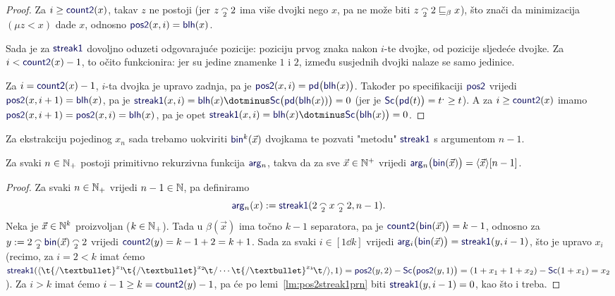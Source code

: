 \begin{proof}
Za $i\ge\f{count2}(x)$, takav $z$ ne postoji (jer $z\conc22$ ima više dvojki nego $x$, pa ne može biti $z\conc22\sqsubseteq_\beta x$), što znači da minimizacija $(\mu z<x)$ dade $x$, odnosno $\f{pos2}(x,i)=\f{blh}(x)$.

Sada je za $\f{streak1}$ dovoljno oduzeti odgovarajuće pozicije: poziciju prvog znaka nakon $i$-te dvojke, od pozicije sljedeće dvojke. Za $i<\f{count2}(x)-1$, to očito funkcionira: jer su jedine znamenke $1$ i $2$, između susjednih dvojki nalaze se samo jedinice.

	Za $i=\f{count2}(x)-1$, $i$-ta dvojka je upravo zadnja, pa je $\f{pos2}(x,i)=\f{pd}\bigl(\f{blh}(x)\bigr)$. Također po specifikaciji $\f{pos2}$ vrijedi $\f{pos2}(x,i+1)=\f{blh}(x)$, pa je $\f{streak1}(x,i)=\f{blh}(x)\dotminus\f{Sc}\bigl(\f{pd}(\f{blh}(x))\bigr)=0$ (jer je $\f{Sc}\bigl(\f{pd}(t)\bigr)=t\bump\ge t$). A za $i\ge\f{count2}(x)$ imamo $\f{pos2}(x,i+1)=\f{pos2}(x,i)=\f{blh}(x)$, pa je opet $\f{streak1}(x,i)=\f{blh}(x)\dotminus\f{Sc}\bigl(\f{blh}(x)\bigr)=0$.
\end{proof}


Za ekstrakciju pojedinog $x_n$ sada trebamo uokviriti $\f{bin}^k(\vec x)$ dvojkama te pozvati "metodu" $\f{streak1}$ s argumentom $n-1$.

\begin{propozicija}[{name=[primitivna rekurzivnost ekstrakcije argumenata]}]\label{pp:argnprn}
    Za svaki $n\in{\mathbb N}_+$ postoji primitivno rekurzivna funkcija $\f{arg}_n$, takva da za sve $\vec x\in{\mathbb N}^+$ vrijedi $\f{arg}_n\bigl(\f{bin}(\vec x)\bigr)=\kr{\vec x}[n-1]$.
\end{propozicija}

\begin{proof}
Za svaki $n\in{\mathbb N}_+$ vrijedi $n-1\in{\mathbb N}$, pa definiramo
\begin{equation}
    \f{arg}_n(x):=\f{streak1}(2\conc2x\conc22,n-1)\text.
\end{equation}
Neka je $\vec x\in{\mathbb N}^k$ proizvoljan ($k\in{\mathbb N}_+$). Tada u $\beta(\vec x)$ ima točno $k-1$ separatora, pa je $\f{count2}\bigl(\f{bin}(\vec x)\bigr)=k-1$, odnosno za $y:=2\conc2\f{bin}(\vec x)\conc22$ vrijedi $\f{count2}(y)=k-1+2=k+1$. Sada za svaki $i\in[1\dd k]$ vrijedi $\f{arg}_i\bigl(\f{bin}(\vec x)\bigr)=\f{streak1}(y,i-1)$, što je upravo $x_i$ (recimo, za $i=2<k$ imat ćemo $\f{streak1}(\kr{\t{/\textbullet}^{x_1}\!\t{/\textbullet}^{x_2}\!\t/\dotsm\t{/\textbullet}^{x_k}\!\t/},1)=\f{pos2}(y,2)-\f{Sc}\bigl(\f{pos2}(y,1)\bigr)=(1+x_1+1+x_2)-\f{Sc}(1+x_1)=x_2$).
Za $i>k$ imat ćemo $i-1\ge k=\f{count2}(y)-1$, pa će po lemi~\ref{lm:pos2streak1prn} biti $\f{streak1}(y,i-1)=0$, kao što i treba.
\end{proof}


